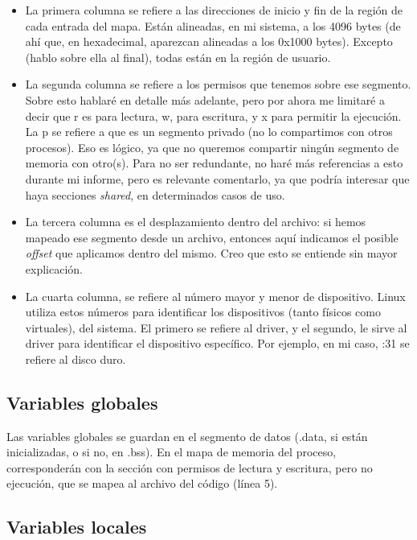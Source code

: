 \documentclass[a4paper]{article}
\begin{document}
\begin{itemize}
    \item La primera columna se refiere a las direcciones de inicio y fin de la región de cada entrada del mapa. Están alineadas, en mi sistema, a los 4096 bytes (de ahí que, en hexadecimal, aparezcan alineadas a los {\ttfamily 0x1000} bytes). Excepto {\ttfamily [vsyscall]} (hablo sobre ella al final), todas están en la región de usuario.
    \item La segunda columna se refiere a los permisos que tenemos sobre ese segmento. Sobre esto hablaré en detalle más adelante, pero por ahora me limitaré a decir que {\ttfamily r} es para lectura, {\ttfamily w}, para escritura, y {\ttfamily x} para permitir la ejecución. La {\ttfamily p} se refiere a que es un segmento privado (no lo compartimos con otros procesos). Eso es lógico, ya que no queremos compartir ningún segmento de memoria con otro(s). Para no ser redundante, no haré más referencias a esto durante mi informe, pero es relevante comentarlo, ya que podría interesar que haya secciones \emph{shared}, en determinados casos de uso.
    \item La tercera columna es el desplazamiento dentro del archivo: si hemos mapeado ese segmento desde un archivo, entonces aquí indicamos el posible \emph{offset} que aplicamos dentro del mismo. Creo que esto se entiende sin mayor explicación.
    \item La cuarta columna, se refiere al número mayor y menor de dispositivo. Linux utiliza estos números para identificar los dispositivos (tanto físicos como virtuales), del sistema. El primero se refiere al driver, y el segundo, le sirve al driver para identificar el dispositivo específico. Por ejemplo, en mi caso, {:31} se refiere al disco duro.
\end{itemize}

\subsection{Variables globales}

Las variables globales se guardan en el segmento de datos ({\ttfamily.data}, si están inicializadas, o si no, en {\ttfamily.bss}). En el mapa de memoria del proceso, corresponderán con la sección con permisos de lectura y escritura, pero no ejecución, que se mapea al archivo del código (línea 5).

\subsection{Variables locales}
\end{document}
